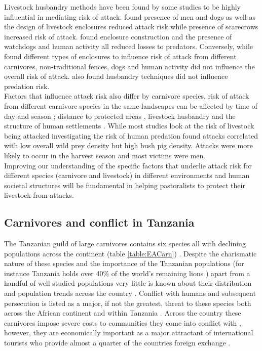 Livestock husbandry methods have been found by some studies to be highly influential in mediating risk of attack. \citet{Woodroffe2007} found presence of men and dogs as well as the design of livestock enclosures reduced attack risk while presence of scarecrows increased risk of attack. \citet{Ogada2003} found enclosure construction and the presence of watchdogs and human activity all reduced losses to predators. Conversely, while \citet{Kolowski2006} found different types of enclosures to influence risk of attack from different carnivores, non-traditional fences, dogs and human activity did not influence the overall risk of attack. \citet{Abade2014h} also found husbandry techniques did not influence predation risk.\\

Factors that influence attack risk also differ by carnivore species, risk of attack from different carnivore species in the same landscapes can be affected by time of day and season \citep{Kissui2008,}; distance to protected areas \citep{Holmern2007a}, livestock husbandry \citep{Woodroffe2007,Kolowski2006} and the structure of human settlements \citep{Kolowski2006}. While most studies look at the risk of livestock being attacked \citet{Packer2005} investigating the risk of human predation found attacks correlated with low overall wild prey density but high bush pig density. Attacks were more likely to occur in the harvest season and most victims were men.\\

Improving our understanding of the specific factors that underlie attack risk for different species (carnivore and livestock) in different environments and human societal structures will be fundamental in helping pastoralists to protect their livestock from attacks.\\

\subsection{Carnivores and conflict in Tanzania}

The Tanzanian guild of large carnivores contains six species all with declining populations across the continent (table \ref{table:EACarn}) \citep{Winterbach2013}. Despite the charismatic nature of these species and the importance of the Tanzanian populations (for instance Tanzania holds over 40\% of the world's remaining lions \citep{Riggio2013}) apart from a handful of well studied populations very little is known about their distribution and population trends across the country \citep{TAWIRI2009}. Conflict with humans and subsequent persecution is listed as a major, if not the greatest, threat to these species both across the African continent and within Tanzania \citep{IUCN2016,Ray2005,TAWIRI2009}. Across the country these carnivores impose severe costs to communities they come into conflict with \citep{Packer2005,Dickman2008,Kissui2008}, however, they are economically important as a major attractant of international tourists who provide almost a quarter of the countries foreign exchange \citep{Bank2015}. 
\\

